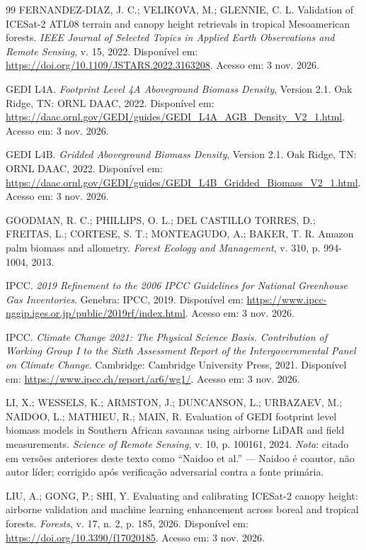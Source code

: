 \begin{thebibliography}{99}
 FERNANDEZ-DIAZ, J. C.; VELIKOVA, M.; GLENNIE, C. L.
Validation of ICESat-2 ATL08 terrain and canopy height retrievals in tropical
Mesoamerican forests. \textit{IEEE Journal of Selected Topics in Applied Earth
Observations and Remote Sensing}, v. 15, 2022. Disponível em:
\url{https://doi.org/10.1109/JSTARS.2022.3163208}. Acesso em: 3 nov. 2026.

 GEDI L4A. \textit{Footprint Level 4A Aboveground Biomass
Density}, Version 2.1. Oak Ridge, TN: ORNL DAAC, 2022. Disponível em:
\url{https://daac.ornl.gov/GEDI/guides/GEDI_L4A_AGB_Density_V2_1.html}. Acesso
em: 3 nov. 2026.

 GEDI L4B. \textit{Gridded Aboveground Biomass Density},
Version 2.1. Oak Ridge, TN: ORNL DAAC, 2022. Disponível em:
\url{https://daac.ornl.gov/GEDI/guides/GEDI_L4B_Gridded_Biomass_V2_1.html}.
Acesso em: 3 nov. 2026.

 GOODMAN, R. C.; PHILLIPS, O. L.; DEL CASTILLO TORRES, D.;
FREITAS, L.; CORTESE, S. T.; MONTEAGUDO, A.; BAKER, T. R. Amazon palm biomass
and allometry. \textit{Forest Ecology and Management}, v. 310, p. 994-1004,
2013.

 IPCC. \textit{2019 Refinement to the 2006 IPCC Guidelines
for National Greenhouse Gas Inventories}. Genebra: IPCC, 2019. Disponível em:
\url{https://www.ipcc-nggip.iges.or.jp/public/2019rf/index.html}. Acesso em:
3 nov. 2026.

 IPCC. \textit{Climate Change 2021: The Physical Science
Basis. Contribution of Working Group I to the Sixth Assessment Report of the
Intergovernmental Panel on Climate Change}. Cambridge: Cambridge University
Press, 2021. Disponível em: \url{https://www.ipcc.ch/report/ar6/wg1/}. Acesso
em: 3 nov. 2026.

 LI, X.; WESSELS, K.; ARMSTON, J.; DUNCANSON, L.; URBAZAEV, M.;
NAIDOO, L.; MATHIEU, R.; MAIN, R. Evaluation of GEDI footprint level biomass
models in Southern African savannas using airborne LiDAR and field
measurements. \textit{Science of Remote Sensing}, v. 10, p. 100161, 2024.
\textit{Nota}: citado em versões anteriores deste texto como ``Naidoo et al.''
--- Naidoo é coautor, não autor líder; corrigido após verificação adversarial
contra a fonte primária.

 LIU, A.; GONG, P.; SHI, Y. Evaluating and calibrating
ICESat-2 canopy height: airborne validation and machine learning enhancement
across boreal and tropical forests. \textit{Forests}, v. 17, n. 2, p. 185,
2026. Disponível em: \url{https://doi.org/10.3390/f17020185}. Acesso em:
3 nov. 2026.


\end{thebibliography}

